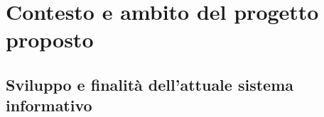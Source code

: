     

\chapter{Contesto e ambito del progetto proposto}
\section{Sviluppo e finalit\` a dell'attuale sistema informativo}

